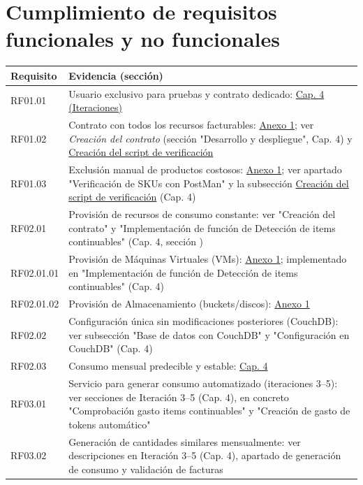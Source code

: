\section{Cumplimiento de requisitos funcionales y no funcionales}
\begin{table}[h!]
	\centering
	\small
	\setlength{\tabcolsep}{6pt}
	\begin{tabular}{|p{2.2cm}|p{14cm}|}
		\hline
			\textbf{Requisito} & \textbf{Evidencia (sección)} \\
		\hline
		RF01.01 & Usuario exclusivo para pruebas y contrato dedicado: \hyperref[chap:iteraciones]{Cap. 4 (Iteraciones)} \\
		\hline
		RF01.02 & Contrato con todos los recursos facturables: \hyperref[anexo:Lista-de-SKUs]{Anexo 1}; ver \textit{Creación del contrato} (sección "Desarrollo y despliegue", Cap. 4) y \hyperref[iteraciones:script-verificacion-postman]{Creación del script de verificación} \\
		\hline
		RF01.03 & Exclusión manual de productos costosos: \hyperref[anexo:Lista-de-SKUs]{Anexo 1}; ver apartado "Verificación de SKUs con PostMan" y la subsección \hyperref[iteraciones:script-verificacion-postman]{Creación del script de verificación} (Cap. 4) \\
		\hline
		RF02.01 & Provisión de recursos de consumo constante: ver "Creación del contrato" y "Implementación de función de Detección de items continuables" (Cap. 4, sección \nameref{chap:iteraciones}) \\
		\hline
		RF02.01.01 & Provisión de Máquinas Virtuales (VMs): \hyperref[anexo:Lista-de-SKUs]{Anexo 1}; implementado en "Implementación de función de Detección de items continuables" (Cap. 4) \\
		\hline
		RF02.01.02 & Provisión de Almacenamiento (buckets/discos): \hyperref[anexo:Lista-de-SKUs]{Anexo 1} \\
		\hline
		RF02.02 & Configuración única sin modificaciones posteriores (CouchDB): ver subsección "Base de datos con CouchDB" y "Configuración en CouchDB" (Cap. 4) \\
		\hline
		RF02.03 & Consumo mensual predecible y estable: \hyperref[chap:iteraciones]{Cap. 4} \\
		\hline
		RF03.01 & Servicio para generar consumo automatizado (iteraciones 3–5): ver secciones de Iteración 3–5 (Cap. 4), en concreto "Comprobación gasto items continuables" y "Creación de gasto de tokens automático" \\
		\hline
		RF03.02 & Generación de cantidades similares mensualmente: ver descripciones en Iteración 3–5 (Cap. 4), apartado de generación de consumo y validación de facturas \\

\end{tabular}
\end{table}
